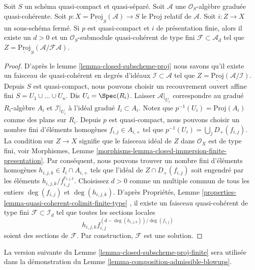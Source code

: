 \begin{lemma}
\label{lemma-closed-subscheme-proj-finite}
Soit  $S$  un schéma quasi-compact et quasi-séparé. Soit  $\mathcal{A}$  une
 $\mathcal{O}_S$-algèbre graduée quasi-cohérente. Soit  $p : X = \underline{\text{Proj}}_S(\mathcal{A}) \to S$  le Proj relatif de
 $\mathcal{A}$. Soit  $i : Z \to X$  un sous-schéma fermé. Si  $p$  est
quasi-compact et  $i$  de présentation finie, alors il existe un
 $d > 0$  et un  $\mathcal{O}_S$-submodule quasi-cohérent de type fini  $\mathcal{F} \subset \mathcal{A}_d$ 
tel que  $Z = \underline{\text{Proj}}_S(\mathcal{A}/\mathcal{F}\mathcal{A})$.
\end{lemma}

\begin{proof}
D'après le lemme \ref{lemma-closed-subscheme-proj} nous savons qu'il existe un faisceau de quasi-cohérent
en degrés d'idéaux $\mathcal{I} \subset \mathcal{A}$ tel que $Z = \underline{\text{Proj}}(\mathcal{A}/\mathcal{I})$. Depuis  $S$ est
quasi-compact, nous pouvons choisir un recouvrement ouvert affine
fini $S = U_1 \cup \ldots \cup U_n$. Dis  $U_i = \Spec(R_i)$. Laisser  $\mathcal{A}|_{U_i}$ correspondre au
gradué $R_i$-algèbre $A_i$  et  $\mathcal{I}|_{U_i}$ à l'idéal
gradué $I_i \subset A_i$. Notez que  $p^{-1}(U_i) = \text{Proj}(A_i)$ comme des plans sur $R_i$. Depuis
 $p$ est quasi-compact, nous pouvons choisir un nombre fini d'éléments
homogènes $f_{i, j} \in A_{i, +}$ tel que $p^{-1}(U_i) = \bigcup_j D_{+}(f_{i, j})$. La condition sur  $Z \to X$  signifie
que le faisceau idéal de  $Z$  dans  $\mathcal{O}_X$  est de type fini, voir
Morphismes, Lemme  \ref{morphisms-lemma-closed-immersion-finite-presentation}. Par conséquent, nous pouvons trouver un nombre
fini d'éléments homogènes  $h_{i, j, k} \in I_i \cap A_{i, +}$  tels que l'idéal de  $Z \cap D_{+}(f_{i, j})$  soit
engendré par les éléments  $h_{i, j, k}/f_{i, j}^{e_{i, j, k}}$. Choisissez  $d > 0$  comme un multiple
commun de tous les entiers  $\deg(f_{i, j})$  et  $\deg(h_{i, j, k})$. D'après Propriétés, Lemme
 \ref{properties-lemma-quasi-coherent-colimit-finite-type} , il existe un faisceau quasi-cohérent de type fini  $\mathcal{F} \subset \mathcal{I}_d$  tel
que toutes les sections locales
$$
h_{i, j, k}f_{i, j}^{(d - \deg(h_{i, j, k}))/\deg(f_{i, j})}
$$
soient des sections de  $\mathcal{F}$. Par construction,  $\mathcal{F}$  est une
solution.
\end{proof}

\noindent
La version suivante du Lemme  \ref{lemma-closed-subscheme-proj-finite}  sera utilisée dans la démonstration du
Lemme  \ref{lemma-composition-admissible-blowups}.

